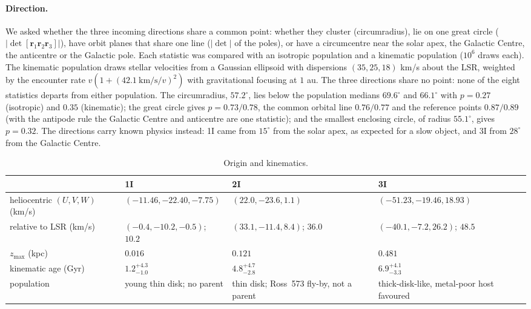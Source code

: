 \documentclass[11pt]{article}
\theoremstyle{definition}\newtheorem{definition}[theorem]{Definition}
\theoremstyle{remark}\newtheorem{remark}[theorem]{Remark}
\begin{document}
\paragraph{Direction.} We asked whether the three incoming directions share a common point: whether they cluster (circumradius), lie on one great circle ($|\det[\mathbf r_1\mathbf r_2\mathbf r_3]|$), have orbit planes that share one line ($|\det|$ of the poles), or have a circumcentre near the solar apex, the Galactic Centre, the anticentre or the Galactic pole. Each statistic was compared with an isotropic population and a kinematic population ($10^6$ draws each). The kinematic population draws stellar velocities from a Gaussian ellipsoid with dispersions $(35,25,18)$ km/s about the LSR, weighted by the encounter rate $v(1+(42.1\ \mathrm{km/s}/v)^2)$ with gravitational focusing at $1$ au. The three directions share no point: none of the eight statistics departs from either population. The circumradius, $57.2^\circ$, lies below the population medians $69.6^\circ$ and $66.1^\circ$ with $p=0.27$ (isotropic) and $0.35$ (kinematic); the great circle gives $p=0.73/0.78$, the common orbital line $0.76/0.77$ and the reference points $0.87/0.89$ (with the antipode rule the Galactic Centre and anticentre are one statistic); and the smallest enclosing circle, of radius $55.1^\circ$, gives $p=0.32$. The directions carry known physics instead: 1I came from $15^\circ$ from the solar apex, as expected for a slow object, and 3I from $28^\circ$ from the Galactic Centre.

\begin{table}[!htb]\centering\small\setlength{\tabcolsep}{4pt}
\begin{tabular}{@{}>{\raggedright\arraybackslash}p{2.6cm}>{\raggedright\arraybackslash}p{3.8cm}>{\raggedright\arraybackslash}p{3.9cm}>{\raggedright\arraybackslash}p{4.2cm}@{}}\toprule
 & 1I & 2I & 3I\\\midrule
heliocentric $(U,V,W)$ (km/s) & $(-11.46,-22.40,-7.75)$ \cite{Mamajek17} & $(22.0,-23.6,1.1)$ \cite{TS25} & $(-51.23,-19.46,18.93)$ \cite{dlFM25}\\
relative to LSR (km/s) & $(-0.4,-10.2,-0.5)$; $10.2$ & $(33.1,-11.4,8.4)$; $36.0$ & $(-40.1,-7.2,26.2)$; $48.5$\\
$z_{\max}$ (kpc) \cite{KL26} & $0.016$ & $0.121$ & $0.481$\\
kinematic age (Gyr) \cite{TS25} & $1.2^{+4.3}_{-1.0}$ & $4.8^{+4.7}_{-2.8}$ & $6.9^{+4.1}_{-3.3}$\\
population & young thin disk; no parent \cite{Mamajek17} & thin disk; Ross~573 fly-by, not a parent \cite{BJ20} & thick-disk-like, metal-poor host favoured \cite{Hopkins25,KL26}\\\bottomrule
\end{tabular}
\caption{Origin and kinematics.}\label{tab:isokin}
\end{table}
\end{document}

